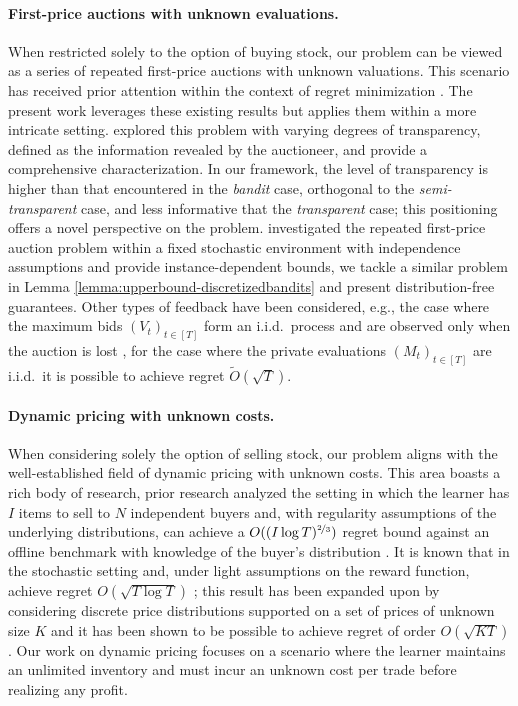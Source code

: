 \documentclass[final,12pt]{colt2025}
\newcommand{\nP}{M}
\newcommand{\nZ}{V}
\renewcommand{\tilde}{\widetilde}
\begin{document}
\paragraph{First-price auctions with unknown evaluations.}
When restricted solely to the option of buying stock, our problem can be viewed as a series of repeated first-price auctions with unknown valuations. This scenario has received prior attention within the context of regret minimization \citep{cesabianchiRoleTransparencyRepeated2024,pmlr-v157-achddou21a}. The present work leverages these existing results but applies them within a more intricate setting. 
\citet{cesabianchiRoleTransparencyRepeated2024} explored this problem with varying degrees of transparency, defined as the information revealed by the auctioneer, and provide a comprehensive characterization. 
In our framework, the level of transparency is higher than that encountered in the \textit{bandit} case, orthogonal to the \textit{semi-transparent} case, and less informative that the \textit{transparent} case; this positioning offers a novel perspective on the problem.
\citet{pmlr-v157-achddou21a} investigated the repeated first-price auction problem within a fixed stochastic environment with independence assumptions and provide instance-dependent bounds, we tackle a similar problem in Lemma \ref{lemma:upperbound-discretizedbandits} and present distribution-free guarantees.
Other types of feedback have been considered, e.g., the case where the maximum bids $(\nZ_t)_{t \in [T]}$ form an i.i.d.\ process and are observed only when the auction is lost \citep{han2024optimalnoregretlearningrepeated}, for the case where the private evaluations $(\nP_t)_{t \in [T]}$ are i.i.d.\ it is possible to achieve regret $\tilde O(\sqrt{T})$.

\paragraph{Dynamic pricing with unknown costs.}
When considering solely the option of selling stock, our problem aligns with the well-established field of dynamic pricing with unknown costs. This area boasts a rich body of research, prior research analyzed the setting in which the learner has $I$ items to sell to $N$ independent buyers and, with regularity assumptions of the underlying distributions, can achieve a $O((I\log T)^{\nicefrac{2}{3}})$ regret bound against an offline benchmark with knowledge of the buyer's distribution \citep{babaioffDynamicPricingLimited2015}. It is known that in the stochastic setting and, under light assumptions on the reward function, achieve regret $O(\sqrt{T\log{T}})$ \citep{kleinberg2003value}; this result has been expanded upon by considering discrete price distributions supported on a set of prices of unknown size $K$ and it has been shown to be possible to achieve regret of order $O(\sqrt{KT})$ \citep{cesa2019dynamic}. 
Our work on dynamic pricing focuses on a scenario where the learner maintains an unlimited inventory and must incur an unknown cost per trade before realizing any profit. 
\end{document}
